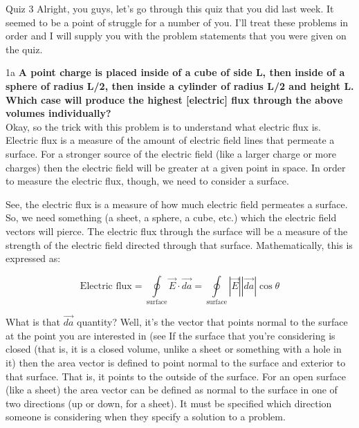 \begin{homeworkProblem}{Quiz 3}
        Alright, you guys, let's go through this quiz that you did last
        week. It seemed to be a point of struggle for a number of
        you. I'll treat these problems in order and I will supply you
        with the problem statements that you were given on the quiz.

    \begin{homeworkSection}{1a}
        \textbf{A point charge is placed inside of a cube of side L,
        then inside of a sphere of radius L/2, then inside a cylinder of
        radius L/2 and height L. Which case will produce the highest
        [electric] flux through the above volumes individually?}
        \\

        Okay, so the trick with this problem is to understand what
        electric flux is. Electric flux is a measure of the amount of
        electric field lines that permeate a surface. For a stronger
        source of the electric field (like a larger charge or more
        charges) then the electric field will be greater at a given
        point in space. In order to measure the electric flux, though,
        we need to consider a surface. 
       
        See, the electric flux is a measure of how much electric field
        permeates a surface. So, we need something (a sheet, a sphere, a
        cube, etc.) which the electric field vectors will pierce. The
        electric flux through the surface will be a measure of the
        strength of the electric field directed through that surface.
        Mathematically, this is expressed as:
        
        \[
        \text{Electric flux} = \oint\limits_{\text{surface}}
        \vec{E}\cdot\vec{da} = \oint\limits_{\text{surface}} |\vec{E}|
        |\vec{da}| \cos\theta 
        \]
       
        What is that $\vec{da}$ quantity? Well, it's the vector that
        points normal to the surface at the point you are interested in
        (see %
        If the surface that you're considering is closed (that is, it
        is a closed volume, unlike a sheet or something with a hole in
        it) then the area vector is defined to point normal to the
        surface and exterior to that surface. That is, it points to the
        outside of the surface. For an open surface (like a sheet) the
        area vector can be defined as normal to the surface in one of
        two directions (up or down, for a sheet). It must be specified
        which direction someone is considering when they specify a
        solution to a problem.
        

\end{homeworkSection}
\end{homeworkProblem}
